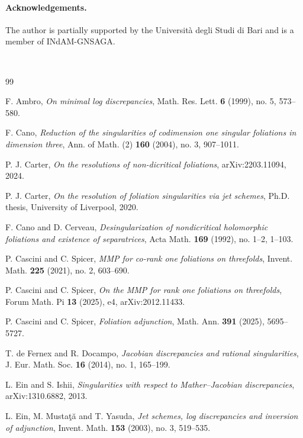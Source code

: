 \documentclass[11pt]{amsart}
\numberwithin{equation}{section}
\theoremstyle{plain}
\theoremstyle{definition}
\def\bibaut#1{{\sc #1}}
\begin{document}
\paragraph{\bf Acknowledgements.} The author is partially supported by the Universit\`a degli Studi di Bari and is a member of INdAM-GNSAGA.

\ \begin{thebibliography}{99}

\bibaut{F. Ambro},
\emph{On minimal log discrepancies},
Math. Res. Lett. \textbf{6} (1999), no. 5, 573--580.

\bibaut{F. Cano},
\emph{Reduction of the singularities of codimension one singular foliations
in dimension three},
Ann. of Math. (2) \textbf{160} (2004), no. 3, 907--1011.

\bibaut{P. J. Carter},
\emph{On the resolutions of non-dicritical foliations},
arXiv:2203.11094, 2024.

\bibaut{P. J. Carter},
\emph{On the resolution of foliation singularities via jet schemes},
Ph.D. thesis, University of Liverpool, 2020.

\bibaut{F. Cano and D. Cerveau},
\emph{Desingularization of nondicritical holomorphic foliations and
existence of separatrices},
Acta Math. \textbf{169} (1992), no. 1--2, 1--103.

\bibaut{P. Cascini and C. Spicer},
\emph{MMP for co-rank one foliations on threefolds},
Invent. Math. \textbf{225} (2021), no. 2, 603--690.

\bibaut{P. Cascini and C. Spicer},
\emph{On the MMP for rank one foliations on threefolds},
Forum Math. Pi \textbf{13} (2025), e4,
arXiv:2012.11433.

\bibaut{P. Cascini and C. Spicer},
\emph{Foliation adjunction},
Math. Ann. \textbf{391} (2025), 5695--5727.

\bibaut{T. de Fernex and R. Docampo},
\emph{Jacobian discrepancies and rational singularities},
J. Eur. Math. Soc. \textbf{16} (2014), no. 1, 165--199.

\bibaut{L. Ein and S. Ishii},
\emph{Singularities with respect to Mather--Jacobian discrepancies},
arXiv:1310.6882, 2013.

\bibaut{L. Ein, M. Musta\c{t}\u{a} and T. Yasuda},
\emph{Jet schemes, log discrepancies and inversion of adjunction},
Invent. Math. \textbf{153} (2003), no. 3, 519--535.


\end{thebibliography}
\end{document}
